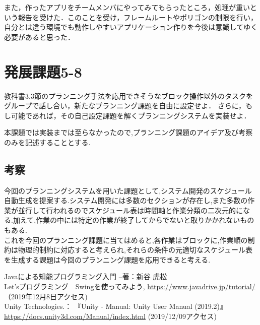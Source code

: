 \documentclass[uplatex,12pt]{jsarticle}
\begin{document}
また，作ったアプリをチームメンバにやってみてもらったところ，処理が重いという報告を受けた．このことを受け，フレームルートやポリゴンの制限を行い，自分とは違う環境でも動作しやすいアプリケーション作りを今後は意識してゆく必要があると思った．



\section{発展課題5-8}
\begin{screen}
    教科書3.3節のプランニング手法を応用できそうなブロック操作以外のタスクをグループで話し合い，新たなプランニング課題を自由に設定せよ．
    さらに，もし可能であれば，その自己設定課題を解くプランニングシステムを実装せよ．
\end{screen}
本課題では実装までは至らなかったので,プランニング課題のアイデア及び考察のみを記述することとする.

\subsection{考察}
今回のプランニングシステムを用いた課題として,システム開発のスケジュール自動生成を提案する.システム開発には多数のセクションが存在し,また多数の作業が並行して行われるのでスケジュール表は時間軸と作業分類の二次元的になる.加えて,作業の中には特定の作業が終了してからでないと取りかかれないものもある.\\
これを今回のプランニング課題に当てはめると,各作業はブロックに,作業順の制約は物理的制約に対応すると考えられ,それらの条件の元適切なスケジュール表を生成する課題は今回のプランニング課題を応用できると考える.


\begin{thebibliography}{99}
 Javaによる知能プログラミング入門 --著：新谷 虎松 \\
 Let'sプログラミング　Swingを使ってみよう, \url{https://www.javadrive.jp/tutorial/} （2019年12月8日アクセス) \\
 Unity Technologies.： 『Unity - Manual: Unity User Manual (2019.2)』 \url{https://docs.unity3d.com/Manual/index.html} (2019/12/09アクセス) \\
\end{thebibliography}
\end{document}
